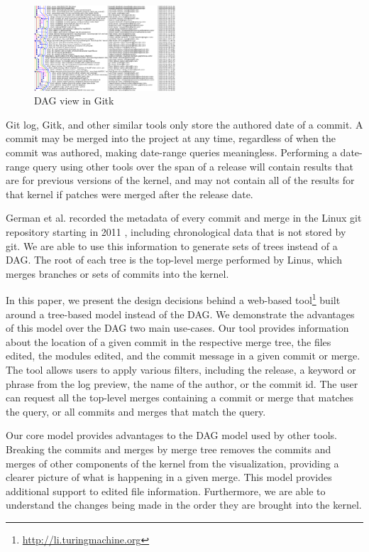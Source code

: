 \documentclass[conference, draftclsnofoot]{IEEEtran}
\begin{document}
\begin{figure}
	\centering
	\includegraphics[width=0.47\textwidth]{figures/gitk.png}
	\caption{DAG view in Gitk}
	\label{fig:gitk}
\end{figure}

Git log, Gitk, and other similar tools only store the authored date of a
commit. A commit may be merged into the project at any time, regardless of when
the commit was authored, making date-range queries meaningless. Performing a
date-range query using other tools over the span of a release will contain
results that are for previous versions of the kernel, and may not contain all
of the results for that kernel if patches were merged after the release date.

German et al. recorded the metadata of every commit and merge in the Linux git
repository starting in 2011 \cite{German}, including chronological data that is
not stored by git. We are able to use this information to generate sets of
trees instead of a DAG. The root of each tree is the top-level merge performed
by Linus, which merges branches or sets of commits into the kernel.

In this paper, we present the design decisions behind a web-based
tool\footnote{\url{http://li.turingmachine.org}} built around a tree-based
model instead of the DAG.  We demonstrate the advantages of this model over the
DAG two main use-cases.  Our tool provides information about the location of a
given commit in the respective merge tree, the files edited, the modules
edited, and the commit message in a given commit or merge.  The tool allows
users to apply various filters, including the release, a keyword or phrase from
the log preview, the name of the author, or the commit id. The user can request
all the top-level merges containing a commit or merge that matches the query,
or all commits and merges that match the query.

Our core model provides advantages to the DAG model used by other tools.
Breaking the commits and merges by merge tree removes the commits and merges of
other components of the kernel from the visualization, providing a clearer
picture of what is happening in a given merge. This model provides additional
support to edited file information. Furthermore, we are able to understand the
changes being made in the order they are brought into the kernel.
\end{document}
